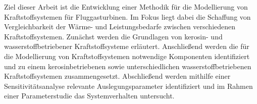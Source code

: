 Ziel dieser Arbeit ist die Entwicklung einer Methodik für die Modellierung von Kraftstoffsystemen für Fluggasturbinen. Im Fokus liegt dabei die Schaffung von Vergleichbarkeit der Wärme- und Leistungsbedarfe zwischen verschiedenen Kraftstoffsystemen. Zunächst werden die Grundlagen von kerosin- und wasserstoffbetriebener Kraftstoffsysteme erläutert. Anschließend werden die für die Modellierung von Kraftstoffsystemen notwendige Komponenten identifiziert und zu einem kerosinbetriebenen sowie unterschiedlichen wasserstoffbetriebenen Kraftstoffsystemen zusammengesetzt. Abschließend werden mithilfe einer Sensitivitätsanalyse relevante Auslegungsparameter identifiziert und im Rahmen einer Parameterstudie das Systemverhalten untersucht.